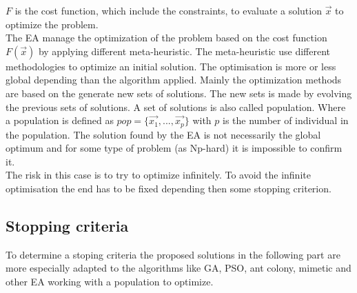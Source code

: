  $F$ is the cost function, which include the constraints, to evaluate a solution $\vec{x}$ to optimize the problem. \\
The EA manage the optimization of the problem based on the cost function $F(\vec{x})$ by applying different meta-heuristic. 
The meta-heuristic use different methodologies to optimize an initial solution. The optimisation is more or less global depending than the algorithm applied. 
Mainly the optimization methods are based on the generate new sets of solutions. The new sets is made by evolving the previous sets of solutions. A set of solutions is also called population. %
Where a population is defined as $pop=\{\vec{x_1}, ...,\vec{x_p}  \}$ with $p$ is the number of individual in the population. 
The solution found by the EA is not necessarily the global optimum and for some type of problem (as Np-hard) it is impossible to confirm it. \\
The risk in this case is to try to optimize infinitely. To avoid the infinite optimisation the end has to be fixed depending then some stopping criterion.

\subsection{Stopping criteria}
 
To  determine a stoping criteria  the proposed solutions in the following part are more especially adapted to the algorithms like GA, PSO, ant colony, mimetic and other EA working with a population to optimize.


